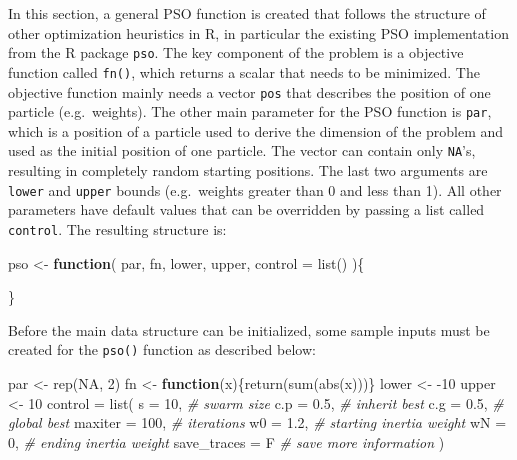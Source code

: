 \documentclass[
  oneside]{book}
\newenvironment{Shaded}{\begin{snugshade}}{\end{snugshade}}
\newcommand{\AttributeTok}[1]{\textcolor[rgb]{0.77,0.63,0.00}{#1}}
\newcommand{\CommentTok}[1]{\textcolor[rgb]{0.56,0.35,0.01}{\textit{#1}}}
\newcommand{\ConstantTok}[1]{\textcolor[rgb]{0.00,0.00,0.00}{#1}}
\newcommand{\ControlFlowTok}[1]{\textcolor[rgb]{0.13,0.29,0.53}{\textbf{#1}}}
\newcommand{\DecValTok}[1]{\textcolor[rgb]{0.00,0.00,0.81}{#1}}
\newcommand{\FloatTok}[1]{\textcolor[rgb]{0.00,0.00,0.81}{#1}}
\newcommand{\FunctionTok}[1]{\textcolor[rgb]{0.00,0.00,0.00}{#1}}
\newcommand{\NormalTok}[1]{#1}
\newcommand{\OtherTok}[1]{\textcolor[rgb]{0.56,0.35,0.01}{#1}}
\newcommand{\SpecialCharTok}[1]{\textcolor[rgb]{0.00,0.00,0.00}{#1}}
\begin{document}
In this section, a general PSO function is created that follows the structure of other optimization heuristics in R, in particular the existing PSO implementation from the R package \texttt{pso}. The key component of the problem is a objective function called \texttt{fn()}, which returns a scalar that needs to be minimized. The objective function mainly needs a vector \texttt{pos} that describes the position of one particle (e.g.~weights). The other main parameter for the PSO function is \texttt{par}, which is a position of a particle used to derive the dimension of the problem and used as the initial position of one particle. The vector can contain only \texttt{NA}'s, resulting in completely random starting positions. The last two arguments are \texttt{lower} and \texttt{upper} bounds (e.g.~weights greater than 0 and less than 1). All other parameters have default values that can be overridden by passing a list called \texttt{control}. The resulting structure is:

\begin{Shaded}
\begin{Highlighting}[]
\NormalTok{pso }\OtherTok{\textless{}{-}} \ControlFlowTok{function}\NormalTok{(}
\NormalTok{    par, }
\NormalTok{    fn, }
\NormalTok{    lower, }
\NormalTok{    upper, }
    \AttributeTok{control =} \FunctionTok{list}\NormalTok{()}
\NormalTok{  )\{}

\NormalTok{\}}
\end{Highlighting}
\end{Shaded}

Before the main data structure can be initialized, some sample inputs must be created for the \texttt{pso()} function as described below:

\begin{Shaded}
\begin{Highlighting}[]
\NormalTok{par }\OtherTok{\textless{}{-}} \FunctionTok{rep}\NormalTok{(}\ConstantTok{NA}\NormalTok{, }\DecValTok{2}\NormalTok{)}
\NormalTok{fn }\OtherTok{\textless{}{-}} \ControlFlowTok{function}\NormalTok{(x)\{}\FunctionTok{return}\NormalTok{(}\FunctionTok{sum}\NormalTok{(}\FunctionTok{abs}\NormalTok{(x)))\}}
\NormalTok{lower }\OtherTok{\textless{}{-}} \SpecialCharTok{{-}}\DecValTok{10}
\NormalTok{upper }\OtherTok{\textless{}{-}} \DecValTok{10}
\NormalTok{control }\OtherTok{=} \FunctionTok{list}\NormalTok{(}
  \AttributeTok{s =} \DecValTok{10}\NormalTok{, }\CommentTok{\# swarm size}
  \AttributeTok{c.p =} \FloatTok{0.5}\NormalTok{, }\CommentTok{\# inherit best}
  \AttributeTok{c.g =} \FloatTok{0.5}\NormalTok{, }\CommentTok{\# global best}
  \AttributeTok{maxiter =} \DecValTok{100}\NormalTok{, }\CommentTok{\# iterations}
  \AttributeTok{w0 =} \FloatTok{1.2}\NormalTok{, }\CommentTok{\# starting inertia weight}
  \AttributeTok{wN =} \DecValTok{0}\NormalTok{, }\CommentTok{\# ending inertia weight}
  \AttributeTok{save\_traces =}\NormalTok{ F }\CommentTok{\# save more information}
\NormalTok{)}
\end{Highlighting}
\end{Shaded}
\end{document}

